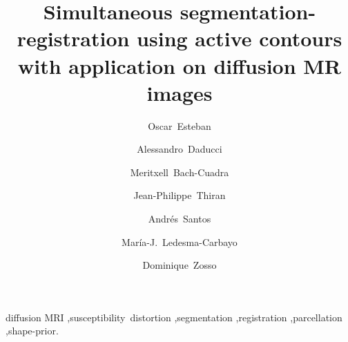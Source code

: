 \documentclass[5p,numbers,sort&compress]{elsarticle}
\begin{document}
\begin{frontmatter}


\title{Simultaneous segmentation-registration using active contours with application on
diffusion MR images}

\author[bit]{Oscar~Esteban}
\author[lts5]{Alessandro~Daducci}
\author[chuv,lts5]{Meritxell~Bach-Cuadra}
\author[lts5]{Jean-Philippe~Thiran}
\author[bit]{Andr\'es~Santos}
\author[bit]{Mar\'ia-J.~Ledesma-Carbayo}
\author[ucla]{Dominique~Zosso}


\address[bit]{Biomedical Image Technologies (BIT), ETSI Telecomunicaci\'on, %
Universidad Polit\'ecnica de Madrid and CIBER-BBN, Madrid, Spain}
\address[lts5]{Signal Processing Laboratory (LTS5), \'Ecole Polytechnique
F\'ed\'erale de Lausanne (EPFL), Lausanne, Switzerland}
\address[chuv]{Dept. of Radiology, University
Hospital Center (CHUV) and University of Lausanne (UNIL), Lausanne, Switzerland}
\address[ucla]{Department of Mathematics, University of California,
Los Angeles (UCLA), Los Angeles, CA, US}

\begin{abstract}

\end{abstract}

\begin{keyword}
diffusion MRI \sep susceptibility~distortion \sep segmentation %
\sep registration \sep parcellation \sep shape-prior.
\end{keyword}

\end{frontmatter}



%






\appendix






\end{document}
